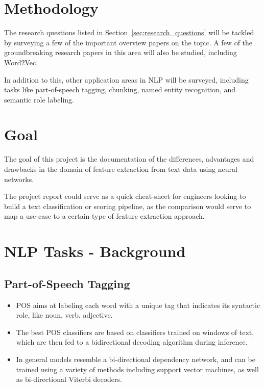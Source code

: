 \documentclass[11pt,a4paper]{article}
\begin{document}

\section{Methodology} %
\label{sec:methodology}

  The research questions listed in Section~\ref{sec:research_questions} will be tackled by surveying a few of the important overview papers on the topic\cite{goldberg2016primer}\cite{bengio2003neural}\cite{morin2005hierarchical}. A few of the groundbreaking research papers in this area will also be studied, including Word2Vec\cite{mikolov2013efficient}\cite{mikolov2013distributed}\cite{mikolov2013linguistic}.

  In addition to this, other application areas in NLP will be surveyed, including tasks like part-of-speech tagging, chunking, named entity recognition, and semantic role labeling. \cite{socher2011parsing}\cite{luong2013better}\cite{maas2015lexicon}\cite{li2015hierarchical}\cite{collobert2011natural}\cite{pennington2014glove}


\section{Goal} %
\label{sec:goal}

  The goal of this project is the documentation of the differences, advantages and drawbacks in the domain of feature extraction from text data using neural networks. 

  The project report could serve as a quick cheat-sheet for engineers looking to build a text classification or scoring pipeline, as the comparison would serve to map a use-case to a certain type of feature extraction approach.



\section{NLP Tasks - Background} %
\label{sec:nlp_tasks_background}

  \subsection{Part-of-Speech Tagging} %
  \label{sub:part_of_speech_tagging}

    \begin{itemize}
      \item 
      POS aims at labeling each word with a unique tag that indicates its syntactic role, like noun, verb, adjective.
      \item 
      The best POS classifiers are based on classifiers trained on windows of text, which are then fed to a bidirectional decoding algorithm during inference.
      \item 
      In general models resemble a bi-directional dependency network, and can be trained using a variety of methods including support vector machines, as well as bi-directional Viterbi decoders.
    \end{itemize}
  
\end{document}
